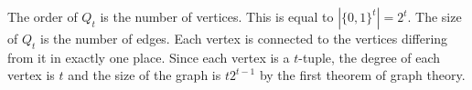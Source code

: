The order of $Q_t$ is the number of vertices. This is equal to $|\{0,1\}^t| = 2^t$.
The size of $Q_t$ is the number of edges. Each vertex is connected to the vertices
differing from it in exactly one place. Since each vertex is a $t$-tuple, the
degree of each vertex is $t$ and
the size of the graph is $t 2^{t-1}$ by the first theorem of graph theory.
